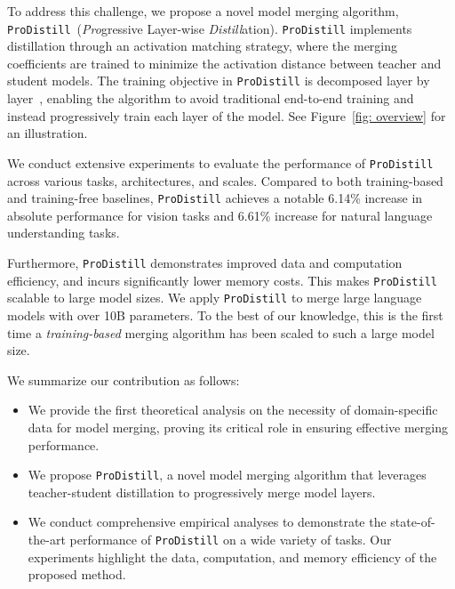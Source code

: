 To address this challenge, we propose a novel model merging algorithm, \texttt{ProDistill}~(\textit{Pro}gressive Layer-wise \textit{Distill}ation). \texttt{ProDistill} implements distillation through an activation matching strategy, where the merging coefficients are trained to minimize the activation distance between teacher and student models.
The training objective in \texttt{ProDistill} is decomposed layer by layer~\citep{bengio2006greedy,kulkarni2017layer,hettinger2017forward,karkar2024module,sakamoto2024end}, enabling the algorithm to avoid traditional end-to-end training and instead progressively train each layer of the model.
See Figure~\ref{fig: overview} for an illustration. 

We conduct extensive experiments to evaluate the performance of \texttt{ProDistill} across various tasks, architectures, and scales. Compared to both training-based and training-free baselines, \texttt{ProDistill} achieves a notable 6.14\% increase in absolute performance for vision tasks and 6.61\% increase for natural language understanding tasks.

Furthermore, \texttt{ProDistill} demonstrates improved data and computation efficiency, and incurs significantly lower memory costs. 
This makes \texttt{ProDistill} scalable to large model sizes. We apply \texttt{ProDistill} to merge large language models with over 10B parameters. To the best of our knowledge, this is the first time a \textit{training-based} merging algorithm has been scaled to such a large model size.


We summarize our contribution as follows:
\begin{itemize}[topsep=0em, itemsep=0em]
  \item We provide the first theoretical analysis on the necessity of domain-specific data for model merging, proving its critical role in ensuring effective merging performance.
  \item We propose \texttt{ProDistill}, a novel model merging algorithm that leverages teacher-student distillation to progressively merge model layers.  
  \item We conduct comprehensive empirical analyses to demonstrate the state-of-the-art performance of \texttt{ProDistill} on a wide variety of tasks. Our experiments highlight the data, computation, and memory efficiency of the proposed method. 
\end{itemize}